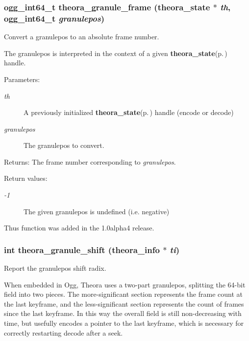\subsubsection{\setlength{\rightskip}{0pt plus 5cm}ogg\_\-int64\_\-t theora\_\-granule\_\-frame ({\bf theora\_\-state} $\ast$ {\em th}, ogg\_\-int64\_\-t {\em granulepos})}\label{theora_8h_072d4900733c1d0798b868dafb50847c}


Convert a granulepos to an absolute frame number. 

The granulepos is interpreted in the context of a given {\bf theora\_\-state}{\rm (p.\,\pageref{structtheora__state})} handle.

\begin{Desc}
\item[Parameters:]
\begin{description}
\item[{\em th}]A previously initialized {\bf theora\_\-state}{\rm (p.\,\pageref{structtheora__state})} handle (encode or decode) \item[{\em granulepos}]The granulepos to convert. \end{description}
\end{Desc}
\begin{Desc}
\item[Returns:]The frame number corresponding to {\em granulepos\/}. \end{Desc}
\begin{Desc}
\item[Return values:]
\begin{description}
\item[{\em -1}]The given granulepos is undefined (i.e. negative)\end{description}
\end{Desc}
Thus function was added in the 1.0alpha4 release. 
\subsubsection{\setlength{\rightskip}{0pt plus 5cm}int theora\_\-granule\_\-shift ({\bf theora\_\-info} $\ast$ {\em ti})}\label{theora_8h_3fd68eba5a134ac84d4db08dd8126991}


Report the granulepos shift radix. 

When embedded in Ogg, Theora uses a two-part granulepos, splitting the 64-bit field into two pieces. The more-significant section represents the frame count at the last keyframe, and the less-significant section represents the count of frames since the last keyframe. In this way the overall field is still non-decreasing with time, but usefully encodes a pointer to the last keyframe, which is necessary for correctly restarting decode after a seek.

